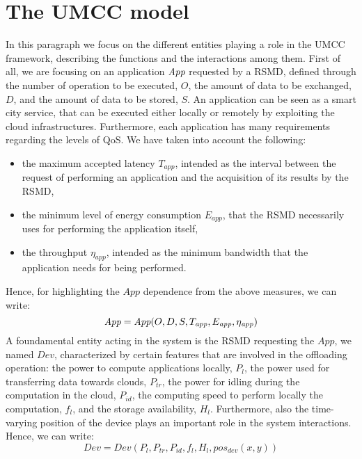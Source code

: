 \documentclass[twoside,openright]{report}
\begin{document}
\section{The UMCC model}
\label{sec:SystemModel}
In this paragraph we focus on the different entities playing a role in the \gls{UMCC} framework, describing the functions and the interactions among them. First of all, we are focusing on an application $\emph{App}$ requested by a \gls{RSMD}, defined through the number of operation to be executed, $O$, the amount of data to be exchanged, $D$, and the amount of data to be stored, $S$. An application can be seen as a smart city service, that can be executed either locally or remotely by exploiting the cloud infrastructures. Furthermore, each application has many requirements regarding the levels of \gls{QoS}. We have taken into account the following:
\begin{itemize}
\item the maximum accepted latency $T_\textit{app}$, intended as the interval between the request of performing an application and the acquisition of its results by the \gls{RSMD},
\item the minimum level of energy consumption $E_\textit{app}$, that the \gls{RSMD} necessarily uses for performing the application itself,
\item the throughput $\eta_\textit{app}$, intended as the minimum bandwidth that the application needs for being performed.
\end{itemize}
Hence, for highlighting the $\textit{App}$ dependence from the above measures, we can write: 
\begin{equation} 
\label{eq:App}
\emph{App} = \emph{App}(O,D,S,T_\textit{app},E_\textit{app},\eta_\textit{app})
\end{equation} 
%
A foundamental entity acting in the system is the \gls{RSMD} requesting the $\textit{App}$, we named $\textit{Dev}$, characterized by certain features that are involved in the offloading operation: the power to compute applications locally, $P_l$, the power used for transferring data towards clouds, $P_{\textit{tr}}$, the power for idling during the computation in the cloud, $P_{\textit{id}}$, the computing speed to perform locally the computation, $f_{\textit{l}}$, and the storage availability, $H_{\textit{l}}$. Furthermore, also the time-varying position of the device plays an important role in the system interactions. Hence, we can write:
\begin{equation}  
Dev = Dev(P_l, P_{\textit{tr}}, P_{\textit{id}}, f_{\textit{l}}, H_{l}, pos_{\textit{dev}}(x, y))
\label{eq:Dev}
\end{equation} 
\end{document}

